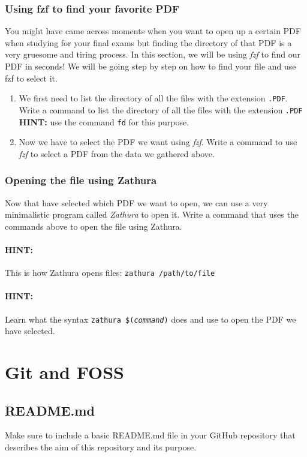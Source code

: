 \documentclass[12pt]{article}
\begin{document}
\subsubsection{Using fzf to find your favorite PDF}
You might have came across moments when you want to open up a certain PDF when studying for your final exams but finding the directory of that
PDF is a very gruesome and tiring process. In this section, we will be using \textit{fzf} to find our PDF in seconds! We will be going step by step
on how to find your file and use fzf to select it.

\begin{enumerate}
    \item We first need to list the directory of all the files with the extension \texttt{.PDF}. Write a command to list the directory of all the files with the extension \texttt{.PDF} \\
        \textbf{HINT:} use the command \texttt{fd} for this purpose.
    \item Now we have to select the PDF we want using \textit{fzf}. Write a command to use \textit{fzf} to select a PDF from the data we gathered above.
\end{enumerate}

\subsubsection{Opening the file using Zathura}
Now that have selected which PDF we want to open, we can use a very minimalistic program called \textit{Zathura} to open it. Write a command that uses the
commands above to open the file using Zathura.
\paragraph{HINT:} This is how Zathura opens files: \texttt{zathura /path/to/file}
\paragraph{HINT:} Learn what the syntax \texttt{zathura \$(\textit{command})} does and use to open the PDF we have selected.

\section{Git and FOSS}
\subsection{README.md}
Make sure to include a basic README.md file in your GitHub repository that describes the aim of this repository and its purpose.
\end{document}
